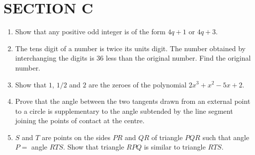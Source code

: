 \documentclass[10pt,twocolumn]{article}
\begin{document}
\section*{SECTION C}

\begin{enumerate}
\item Show that any positive odd integer is of the form $4q+1$ or $4q+3$.

\item The tens digit of a number is twice its units digit. The number obtained by interchanging the digits is $36$ less than the original number. Find the original number.

\item Show that $1$, $1/2$ and $2$ are the zeroes of the polynomial $2x^3 + x^2 - 5x + 2$.

\item Prove that the angle between the two tangents drawn from an external point to a circle is supplementary to the angle subtended by the line segment joining the points of contact at the centre.

\item $S$ and $T$ are points on the sides $PR$ and $QR$ of triangle $PQR$ such that angle $P = $ angle $RTS$. Show that triangle $RPQ$ is similar to triangle $RTS$.
\end{enumerate}
\end{document}
